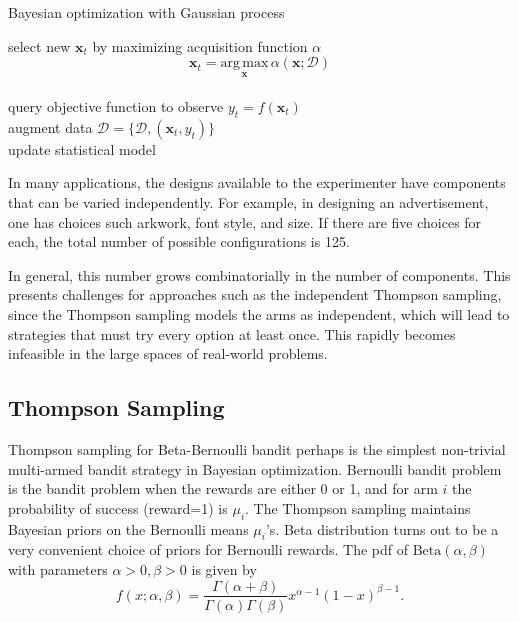 \documentclass{article}
\begin{document}
\begin{algorithm}[h] \label{algo:bo}

 \caption{Bayesian optimization with Gaussian process}
  {
   select new $\mathbf{x}_{t}$ by maximizing acquisition function
   $\alpha$
   $$
     \mathbf{x}_{t} = \underset{\mathbf{x}}{\mathrm{arg \, max}} \, \alpha(\mathbf{x};\mathcal{D})
     $$\\
     query objective function to observe $y_{t} =
     f(\mathbf{x}_{t})$ \\
     augment data $\mathcal{D}=\{ \mathcal{D},
     (\mathbf{x}_{t}, y_{t}) \}$\\
     update statistical model
 }
\end{algorithm}
In many applications, the designs available to the experimenter have
components that can be varied independently. For example, in designing
an advertisement, one has choices such arkwork, font style, and
size. If there are five choices for each, the total number of possible
configurations is 125.

In general, this number grows combinatorially in the number of
components. This presents challenges for approaches such as the independent
Thompson sampling, since the Thompson sampling models the arms as independent, which will lead
to strategies that must try every option at least once. This rapidly
becomes infeasible in the large spaces of real-world problems.

\subsection{Thompson Sampling}
Thompson sampling for Beta-Bernoulli bandit perhaps is the simplest non-trivial multi-armed
bandit strategy in Bayesian optimization. Bernoulli bandit problem is
the bandit problem when the rewards are either 0 or 1, and for arm $i$
the probability of success (reward=1) is $\mu_i$. The Thompson
sampling maintains Bayesian priors on the Bernoulli means
$\mu_i$'s. Beta distribution turns out to be a very convenient choice
of priors for Bernoulli rewards. The pdf of $\mathrm{Beta}(\alpha,
\beta)$ with parameters $\alpha > 0, \beta > 0$ is given by
\begin{equation}
  f(x;\alpha, \beta) = \frac{\Gamma(\alpha + \beta)}{\Gamma(\alpha)\Gamma(\beta)}x^{\alpha-1}(1-x)^{\beta-1}.
\end{equation}
\end{document}
